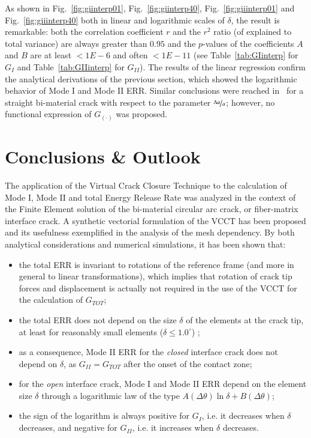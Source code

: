 \documentclass[review]{elsarticle}
\begin{document}
As shown in Fig.~\ref{fig:giinterp01}, Fig.~\ref{fig:giinterp40}, Fig.~\ref{fig:giiinterp01} and Fig.~\ref{fig:giiinterp40} both in linear and logarithmic scales of $\delta$, the result is remarkable: both the correlation coefficient $r$ and the $r^{2}$ ratio (of explained to total variance) are always greater than $0.95$ and the $p$-values of the coefficients $A$ and $B$ are at least $<1E-6$ and often $<1E-11$ (see Table~\ref{tab:GIinterp} for $G_{I}$ and Table~\ref{tab:GIIinterp} for $G_{II}$). The results of the linear regression confirm the analytical derivations of the previous section, which showed the logarithmic behavior of Mode I and Mode II ERR. Similar conclusions were reached in~\cite{Sun1987,Manoharan1990} for a straight bi-material crack with respect to the parameter $\nicefrac{\Delta a}{a}$; however, no functional expression of $G_{\left(\cdot\right)}$ was proposed.

\section{Conclusions \& Outlook}

The application of the Virtual Crack Closure Technique to the calculation of Mode I, Mode II and total Energy Release Rate was analyzed in the context of the Finite Element solution of the bi-material circular arc crack, or fiber-matrix interface crack. A synthetic vectorial formulation of the VCCT has been proposed and its usefulness exemplified in the analysis of the mesh dependency. By both analytical considerations and numerical simulations, it has been shown that:

\begin{itemize}
\item the total ERR is invariant to rotations of the reference frame (and more in general to linear transformations), which implies that rotation of crack tip forces and displacement is actually not required in the use of the VCCT for the calculation of $G_{TOT}$;
\item the total ERR does not depend on the size $\delta$ of the elements at the crack tip, at least for reasonably small elements ($\delta\leq1.0^{\circ}$) ;
\item as a consequence, Mode II ERR for the \emph{closed} interface crack does not depend on $\delta$, as $G_{II}=G_{TOT}$ after the onset of the contact zone;
\item for the \emph{open} interface crack, Mode I and Mode II ERR depend on the element size $\delta$ through a logarithmic law of the type $A\left(\Delta\theta\right)\ln\delta+B\left(\Delta\theta\right)$;
\item the sign of the logarithm is always positive for $G_{I}$, i.e. it decreases when $\delta$ decreases, and negative for $G_{II}$, i.e. it increases when $\delta$ decreases.
\end{itemize}
\end{document}
